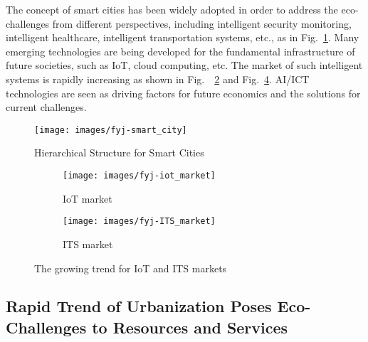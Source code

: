 \documentclass[letterpaper, twocolumn, 10pt, conference]{IEEEtran}
\begin{document}
The concept of smart cities has been widely adopted in order to address the eco-challenges from different perspectives, including intelligent security monitoring, intelligent healthcare, intelligent transportation systems, etc., as in Fig.~\ref{fig:fyj:smart_city}. Many emerging technologies are being developed for the fundamental infrastructure of future societies, such as IoT, cloud computing, etc. The market of such intelligent systems is rapidly increasing as shown in Fig.~~\ref{fig:fyj:iot_market} and Fig.~\ref{fig:fyj:ITS_market}. AI/ICT technologies are seen as driving factors for future economics and the solutions for current challenges.

\begin{figure}[h!]
    \centering
    \texttt{[image: images/fyj-smart\_city]}
    \caption{Hierarchical Structure for Smart Cities}
    \label{fig:fyj:smart_city}
\end{figure}

\begin{figure}[h!]
	\centering
	\begin{subfigure}[h!]{0.45\linewidth}
	    \texttt{[image: images/fyj-iot\_market]}
	    \caption{IoT market}
	    \label{fig:fyj:iot_market}
	\end{subfigure}
	\begin{subfigure}[h!]{0.45\linewidth}
		\texttt{[image: images/fyj-ITS\_market]}
		\caption{ITS market}
		\label{fig:fyj:ITS_market}
	\end{subfigure}
	\caption{The growing trend for IoT and ITS markets}
\end{figure}

\subsection{Rapid Trend of Urbanization Poses Eco-Challenges to Resources and Services}
\label{ssec:urbanization-challenges}
\end{document}
